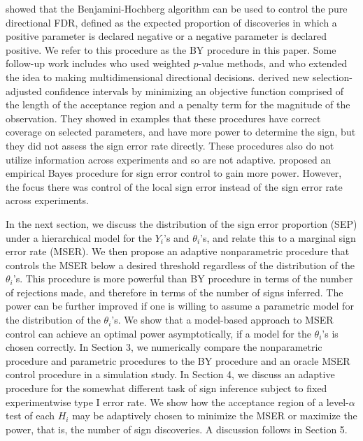 \documentclass[11pt]{article}
\begin{document}
\citet{Benjamini2005} showed that the Benjamini-Hochberg algorithm can be used to control the pure directional FDR, defined as the expected proportion of discoveries in which a positive parameter is declared negative or a negative parameter is declared positive. We refer to this procedure as the BY procedure in this paper. Some follow-up work includes \citet{zhao2015} who used weighted $p$-value methods, and \citet{guo2010} who extended the idea to making multidimensional directional decisions. \citet{weinstein2013selection} derived new selection-adjusted confidence intervals by minimizing an objective function comprised of the length of the acceptance region and a penalty term for the magnitude of the observation. They showed in examples that these procedures have correct coverage on selected parameters, and have more power to determine the sign, but they did not assess the sign error rate directly. These procedures also do not utilize information across experiments and so are not adaptive.
\citet{Stephens2016} proposed an empirical Bayes procedure for sign error control to gain more power. However, the focus there was control of the local sign error instead of the sign error rate across experiments. 

In the next section, we 
discuss the distribution of the sign error proportion (SEP)
under a hierarchical model for 
the $Y_i$'s and $\theta_i$'s, and relate this to %
a marginal 
sign error rate (MSER). We then propose an adaptive nonparametric procedure that 
controls the MSER below a desired threshold regardless of the 
distribution of the $\theta_i$'s. This procedure is more powerful than BY procedure in terms of the number of rejections made, and therefore in terms of the 
number of signs inferred. The power can 
be further improved if one is willing to assume a parametric model 
for the distribution of the $\theta_i$'s. We show that 
a model-based approach to MSER control can achieve an 
optimal power asymptotically, if a model for the $\theta_i$'s 
is chosen correctly. In Section 3, we numerically compare  the nonparametric procedure
and parametric procedures to the BY procedure and an oracle MSER control procedure 
in a simulation study. 
In Section 4, we discuss an adaptive procedure 
for the somewhat different task of sign inference subject 
to fixed experimentwise type I error rate. We show how the acceptance region
of a level-$\alpha$ test of each $H_i$ may be adaptively chosen 
to minimize the MSER or maximize the power, that is, the number of sign discoveries. A discussion follows in Section 5. 
\end{document}
